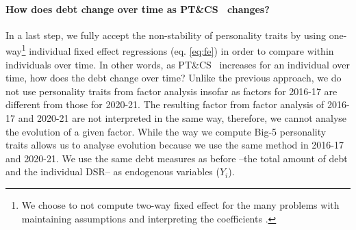 \documentclass[a4paper, 12pt, onecolumn]{article}
\newcommand{\PTCS}{PT\&CS}
\begin{document}



\paragraph{How does debt change over time as \PTCS~ changes?}
In a last step, we fully accept the non-stability of personality traits by using one-way\footnote{We choose to not compute two-way fixed effect for the many problems with maintaining assumptions and interpreting the coefficients \citep{Kropko2020,Imai2020}.} individual fixed effect regressions (eq. \ref{eq:fe}) in order to compare within individuals over time.
In other words, as \PTCS~ increases for an individual over time, how does the debt change over time?
Unlike the previous approach, we do not use personality traits from factor analysis insofar as factors for 2016-17 are different from those for 2020-21.
The resulting factor from factor analysis of 2016-17 and 2020-21 are not interpreted in the same way, therefore, we cannot analyse the evolution of a given factor.
While the way we compute Big-5 personality traits allows us to analyse evolution because we use the same method in 2016-17 and 2020-21.
We use the same debt measures as before --the total amount of debt and the individual DSR-- as endogenous variables ($Y_{i}$). 
\end{document}

